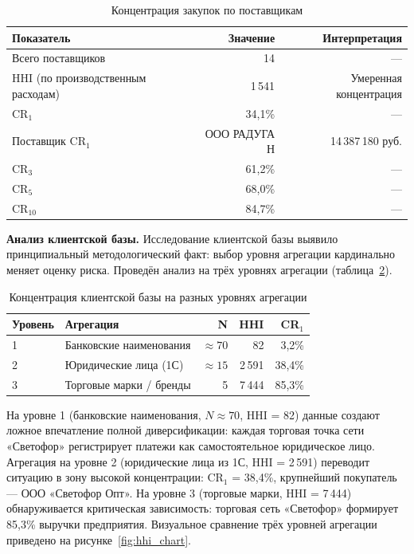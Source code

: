 \begin{table}[H]
\centering
\caption{Концентрация закупок по поставщикам}
\label{tab:supplier_concentration}
\begin{tabular}{lrr}
\toprule
\textbf{Показатель} & \textbf{Значение} & \textbf{Интерпретация} \\
\midrule
Всего поставщиков & 14 & --- \\
HHI (по производственным расходам) & 1\,541 & Умеренная концентрация \\
CR$_1$ & 34,1\% & --- \\
Поставщик CR$_1$ & ООО РАДУГА Н & 14\,387\,180 руб. \\
CR$_3$ & 61,2\% & --- \\
CR$_5$ & 68,0\% & --- \\
CR$_{10}$ & 84,7\% & --- \\
\bottomrule
\end{tabular}
\end{table}

\textbf{Анализ клиентской базы.} Исследование клиентской базы выявило принципиальный методологический факт: выбор уровня агрегации кардинально меняет оценку риска. Проведён анализ на трёх уровнях агрегации (таблица~\ref{tab:client_concentration}).

\begin{table}[H]
\centering
\caption{Концентрация клиентской базы на разных уровнях агрегации}
\label{tab:client_concentration}
\begin{tabular}{llrrr}
\toprule
\textbf{Уровень} & \textbf{Агрегация} & \textbf{N} & \textbf{HHI} & \textbf{CR}$_1$ \\
\midrule
1 & Банковские наименования & $\approx 70$ & 82 & 3,2\% \\
2 & Юридические лица (1С) & $\approx 15$ & 2\,591 & 38,4\% \\
3 & Торговые марки / бренды & 5 & 7\,444 & 85,3\% \\
\bottomrule
\end{tabular}
\end{table}

На уровне 1 (банковские наименования, $N \approx 70$, HHI = 82) данные создают ложное впечатление полной диверсификации: каждая торговая точка сети «Светофор» регистрирует платежи как самостоятельное юридическое лицо. Агрегация на уровне 2 (юридические лица из 1С, HHI = 2\,591) переводит ситуацию в зону высокой концентрации: CR$_1$ = 38,4\%, крупнейший покупатель --- ООО «Светофор Опт». На уровне 3 (торговые марки, HHI = 7\,444) обнаруживается критическая зависимость: торговая сеть «Светофор» формирует 85,3\% выручки предприятия. Визуальное сравнение трёх уровней агрегации приведено на рисунке~\ref{fig:hhi_chart}.

